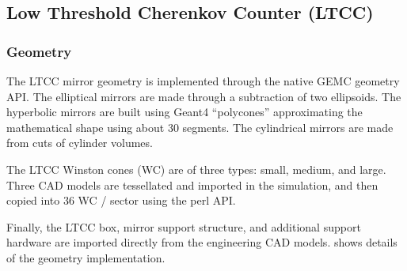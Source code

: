 \subsection{Low Threshold Cherenkov Counter (LTCC)}

\subsubsection{Geometry}
The LTCC mirror geometry is implemented through the native GEMC geometry API. The elliptical mirrors are made through a subtraction of
two ellipsoids. The hyperbolic mirrors are built using Geant4 ``polycones'' approximating the mathematical shape using about 30 segments.
The cylindrical mirrors are made from cuts of cylinder volumes.

The LTCC Winston cones (WC) are of three types: small, medium, and large. Three CAD models are tessellated and imported in the simulation, and
then copied into 36 WC / sector using the perl API.

Finally, the LTCC box, mirror support structure, and additional support hardware are imported directly from the engineering CAD models.
 shows details of the geometry implementation.

